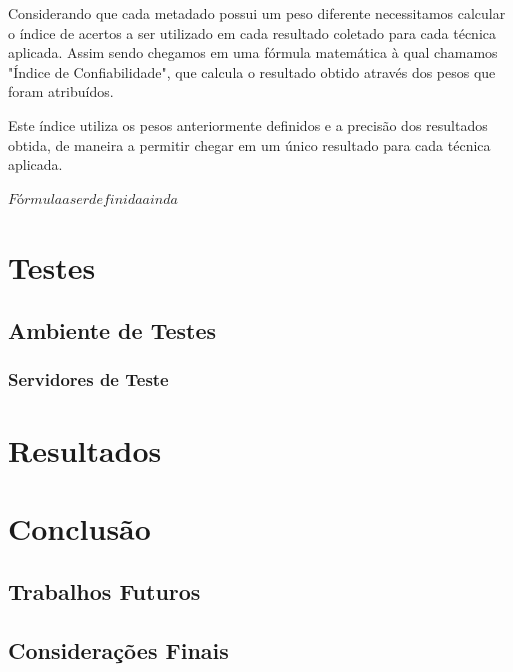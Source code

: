 \documentclass[
	12pt,               %
	openright,          %
	twoside,            %
	a4paper,            %
	english,            %
	brazil              %
	]{abntex2}
\begin{document}

Considerando que cada metadado possui um peso diferente necessitamos calcular o índice de acertos a ser utilizado em cada resultado coletado para cada técnica aplicada. Assim sendo chegamos em uma fórmula matemática à qual chamamos "Índice de Confiabilidade", que calcula o resultado obtido através dos pesos que foram atribuídos.

Este índice utiliza os pesos anteriormente definidos e a precisão dos resultados obtida, de maneira a permitir chegar em um único resultado para cada técnica aplicada.

\begin{center}
	$ Fórmula a ser definida ainda $
\end{center}


\chapter{Testes}

\section{Ambiente de Testes}

\subsection{Servidores de Teste}

\chapter{Resultados}

\chapter{Conclusão}

\section{Trabalhos Futuros}

\section{Considerações Finais}



\postextual
\end{document}

